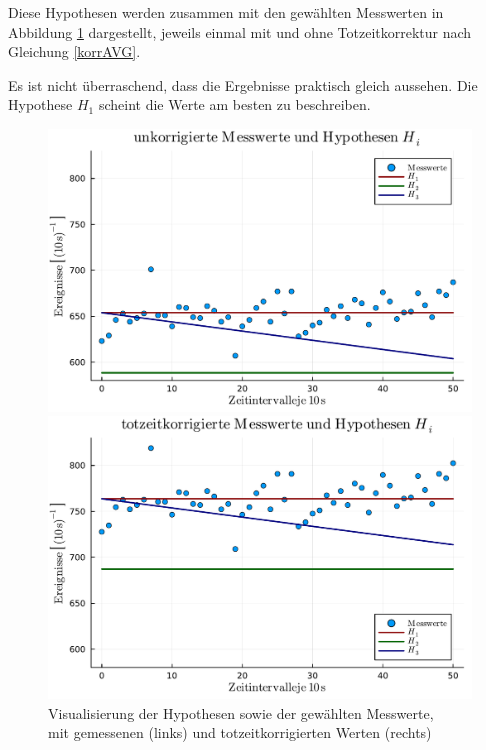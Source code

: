 \documentclass[12pt,a4paper]{scrartcl}
\numberwithin{equation}{section} %
\begin{document}
Diese Hypothesen werden zusammen mit den gewählten Messwerten in Abbildung \ref{abb:Hypothesen} dargestellt, jeweils einmal mit und ohne Totzeitkorrektur nach Gleichung \eqref{korrAVG}.

Es ist nicht überraschend, dass die Ergebnisse praktisch gleich aussehen. Die Hypothese $H_1$ scheint die Werte am besten zu beschreiben.

\begin{figure}[h!]
	\centering
	\begin{minipage}{0.49\textwidth}
		\includegraphics[width=\textwidth]{../media/B3.1/Hypothesen_plot.pdf}
	\end{minipage}
	\begin{minipage}{0.49\textwidth}
		\includegraphics[width=\textwidth]{../media/B3.1/Hypothesen_plot_corr.pdf}
	\end{minipage}
	\caption{Visualisierung der Hypothesen sowie der gewählten Messwerte,\\
		mit gemessenen (links) und totzeitkorrigierten Werten (rechts)}
	\label{abb:Hypothesen}
\end{figure}
\end{document}
